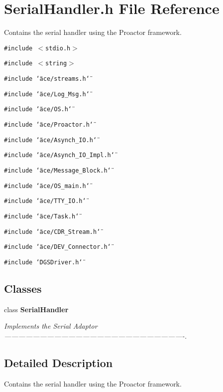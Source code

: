 \section{Serial\-Handler.h File Reference}
\label{SerialHandler_8h}
Contains the serial handler using the Proactor framework.  


{\tt \#include $<$stdio.h$>$}\par
{\tt \#include $<$string$>$}\par
{\tt \#include \char`\"{}ace/streams.h\char`\"{}}\par
{\tt \#include \char`\"{}ace/Log\_\-Msg.h\char`\"{}}\par
{\tt \#include \char`\"{}ace/OS.h\char`\"{}}\par
{\tt \#include \char`\"{}ace/Proactor.h\char`\"{}}\par
{\tt \#include \char`\"{}ace/Asynch\_\-IO.h\char`\"{}}\par
{\tt \#include \char`\"{}ace/Asynch\_\-IO\_\-Impl.h\char`\"{}}\par
{\tt \#include \char`\"{}ace/Message\_\-Block.h\char`\"{}}\par
{\tt \#include \char`\"{}ace/OS\_\-main.h\char`\"{}}\par
{\tt \#include \char`\"{}ace/TTY\_\-IO.h\char`\"{}}\par
{\tt \#include \char`\"{}ace/Task.h\char`\"{}}\par
{\tt \#include \char`\"{}ace/CDR\_\-Stream.h\char`\"{}}\par
{\tt \#include \char`\"{}ace/DEV\_\-Connector.h\char`\"{}}\par
{\tt \#include \char`\"{}DGSDriver.h\char`\"{}}\par
\subsection*{Classes}
\begin{CompactItemize}
\item 
class {\bf Serial\-Handler}
\begin{CompactList}\small\item\em Implements the Serial Adaptor ----------------------------------------------------------------------------. \item\end{CompactList}\end{CompactItemize}


\subsection{Detailed Description}
Contains the serial handler using the Proactor framework. 

